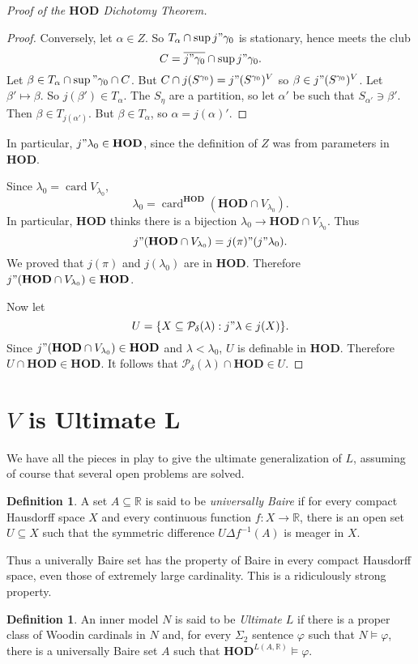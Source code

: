 \documentclass[12pt]{report}
\newcommand{\RR}{\mathbb{R}}
\newcommand{\card}{\operatorname{card}}
\newcommand{\pset}{\mathcal{P}}
\newcommand{\HOD}{\mathbf{HOD}}
\newcommand{\dfn}[1]{\emph{#1}\index{#1}}
\theoremstyle{definition}
\newtheorem{definition}[theorem]{Definition}
\begin{document}
\begin{proof}[Proof of the $\HOD$ Dichotomy Theorem]
\begin{proof}
Conversely, let $\alpha \in Z$. So $T_\alpha \cap \sup j"\gamma_0$ is stationary, hence meets the club
$$C = \overline{j"\gamma_0} \cap \sup j"\gamma_0.$$
Let $\beta \in T_\alpha \cap \sup"\gamma_0 \cap C$. But $C \cap j(S^{\gamma_0}) = j"(S^{\gamma_0})^V$ so $\beta \in j"(S^{\gamma_0})^V$.
Let $\beta' \mapsto \beta$. So $j(\beta') \in T_\alpha$.
The $S_\eta$ are a partition, so let $\alpha'$ be such that $S_{\alpha'} \ni \beta'$. Then $\beta \in T_{j(\alpha')}$. But $\beta \in T_\alpha$, so $\alpha = j(\alpha)'$.
\end{proof}
In particular, $j"\lambda_0 \in \HOD$, since the definition of $Z$ was from parameters in $\HOD$.

Since $\lambda_0 = \card V_{\lambda_0}$,
$$\lambda_0 = \card^\HOD(\HOD \cap V_{\lambda_0}).$$
In particular, $\HOD$ thinks there is a bijection $\lambda_0 \to \HOD \cap V_{\lambda_0}$.
Thus
$$j"(\HOD \cap V_{\lambda_0}) = j(\pi)"(j"\lambda_0).$$
We proved that $j(\pi)$ and $j(\lambda_0)$ are in $\HOD$. Therefore $j"(\HOD \cap V_{\lambda_0}) \in \HOD$.

Now let
$$U = \{X \subseteq \pset_\delta(\lambda): j"\lambda \in j(X)\}.$$
Since $j"(\HOD \cap V_{\lambda_0}) \in \HOD$ and $\lambda < \lambda_0$, $U$ is definable in $\HOD$.
Therefore $U \cap \HOD \in \HOD$. It follows that $\pset_\delta(\lambda) \cap \HOD \in U$.
\end{proof}


\section{$V$ is Ultimate L}
We have all the pieces in play to give the ultimate generalization of $L$, assuming of course that several open problems are solved.

\begin{definition}
A set $A \subseteq \RR$ is said to be \dfn{universally Baire} if for every compact Hausdorff space $X$ and every continuous function $f: X \to \RR$, there is an open set $U \subseteq X$ such that the symmetric difference $U \Delta f^{-1}(A)$ is meager in $X$.
\end{definition}
Thus a univerally Baire set has the property of Baire in every compact Hausdorff space, even those of extremely large cardinality. This is a ridiculously strong property.

\begin{definition}
An inner model $N$ is said to be \dfn{Ultimate $L$} if there is a proper class of Woodin cardinals in $N$ and, for every $\Sigma_2$ sentence $\varphi$ such that $N \models \varphi$, there is a universally Baire set $A$ such that $\HOD^{L(A, \RR)} \models \varphi$.
\end{definition}
\end{document}
